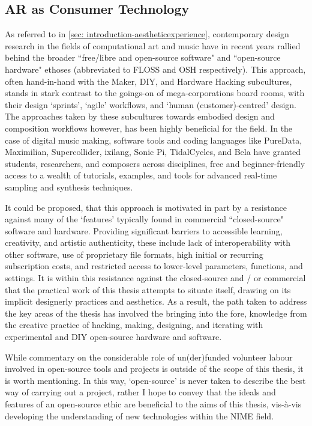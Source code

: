 \subsection{AR as Consumer Technology} \label{sec: method-resistance-maker}
As referred to in \autoref{sec: introduction-aestheticexperience}, contemporary design research in the fields of computational art and music have in recent years rallied behind the broader ``free/libre and open-source software" and ``open-source hardware" ethoses (abbreviated to FLOSS and OSH respectively). This approach, often hand-in-hand with the Maker, DIY, and Hardware Hacking subcultures, stands in stark contrast to the goings-on of mega-corporations board rooms, with their design `sprints', `agile' workflows, and `human (customer)-centred' design. The approaches taken by these subcultures towards embodied design and composition workflows however, has been highly beneficial for the field. In the case of digital music making, software tools and coding languages like PureData, Maximilian, Supercollider, ixilang, Sonic Pi, TidalCycles, and Bela have granted students, researchers, and composers across disciplines, free and beginner-friendly access to a wealth of tutorials, examples, and tools for advanced real-time sampling and synthesis techniques.

It could be proposed, that this approach is motivated in part by a resistance against many of the `features' typically found in commercial ``closed-source" software and hardware. Providing significant barriers to accessible learning, creativity, and artistic authenticity, these include lack of interoperability with other software, use of proprietary file formats, high initial or recurring subscription costs, and restricted access to lower-level parameters, functions, and settings. It is within this resistance against the closed-source and / or commercial that the practical work of this thesis attempts to situate itself, drawing on its implicit designerly practices and aesthetics. As a result, the path taken to address the key areas of the thesis has involved the bringing into the fore, knowledge from the creative practice of hacking, making, designing, and iterating with experimental and DIY open-source hardware and software.

While commentary on the considerable role of un(der)funded volunteer labour involved in open-source tools and projects is outside of the scope of this thesis, it is worth mentioning. In this way, `open-source' is never taken to describe the best way of carrying out a project, rather I hope to convey that the ideals and features of an open-source ethic are beneficial to the aims of this thesis, vis-à-vis developing the understanding of new technologies within the NIME field.

